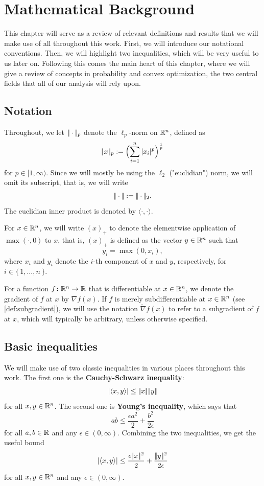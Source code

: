 \chapter{Mathematical Background}
\label{chap:background}

This chapter will serve as a review of relevant definitions and results that we will make
use of all throughout this work. First, we will introduce our notational conventions.
Then, we will highlight two inequalities, which will be very useful to us later on.
Following this comes the main heart of this chapter, where we
will give a review of concepts in probability and convex optimization, the
two central fields that all of our analysis will rely upon.

\section{Notation}

Throughout, we let $|\!|\cdot|\!|_p$ denote the
$\ell_p$-norm on $\mathbb{R}^n$, defined as
\[
    |\!|x|\!|_p := \Bigl(\sum_{i=1}^n | x_i |^p\Bigr)^{\frac{1}{p}}
\]
for $p\in[1, \infty)$. Since we will mostly be using the $\ell_2$ ("euclidian") norm,
we will omit its subscript, that is, we will write
\[
    |\!|\cdot|\!| := |\!|\cdot|\!|_2.
\]
The euclidian inner product is denoted by $\langle \cdot, \cdot \rangle$.

For $x\in\mathbb{R}^n$, we will write $(x)_+$ to denote the elementwise application of $\max(\cdot, 0)$ to $x$,
that is, $(x)_+$ is defined as the vector $y\in\mathbb{R}^n$
such that
\[
    y_i = \max(0, x_i),
\]
where $x_i$ and $y_i$ denote the $i$-th component of $x$ and $y$, respectively, for $i\in\{\,1,\dots,n\,\}$.

For a function $f\colon\mathbb{R}^n\to\mathbb{R}$ that is differentiable at $x\in\mathbb{R}^n$, we denote the gradient of $f$ at $x$ by
$\nabla f(x)$.
If $f$ is merely subdifferentiable at $x\in\mathbb{R}^n$ (see \cref{def:subgradient}), we will use the
notation $\tilde{\nabla} f(x)$ to refer to a subgradient of $f$ at $x$, which will typically be arbitrary,
unless otherwise specified.

\section{Basic inequalities}

We will make use of two classic inequalities in various places throughout this work.
The first one is the \textbf{Cauchy-Schwarz inequality}:
\[
    | \langle x, y \rangle | \leq |\!|x|\!| |\!|y|\!|
\]
for all $x,y\in\mathbb{R}^n$. The second one is \textbf{Young's inequality}, which says that
\[
    ab \leq \frac{\epsilon a^2}{2} + \frac{b^2}{2\epsilon}
\]
for all $a,b\in\mathbb{R}$ and any $\epsilon\in(0,\infty)$.
Combining the two inequalities, we get
the useful bound
\[
    | \langle x, y \rangle | \leq \frac{\epsilon |\!|x|\!|^2}{2} + \frac{|\!|y|\!|^2}{2\epsilon}
\]
for all $x,y\in\mathbb{R}^n$ and any $\epsilon\in(0, \infty)$.

